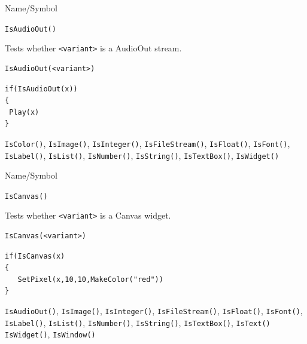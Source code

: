 \begin{desc}{Name/Symbol}
\item[Name/Symbol]	\verb+IsAudioOut()+

\item[Description]	Tests whether \verb+<variant>+ is a AudioOut stream.

\item[Usage]
\begin{verbatim}
IsAudioOut(<variant>)
\end{verbatim}

\item[Example]
\begin{verbatim}
if(IsAudioOut(x))
{
 Play(x)
}
\end{verbatim}

\item[See Also] \verb+IsColor()+, \verb+IsImage()+,
  \verb+IsInteger()+, \verb+IsFileStream()+, \verb+IsFloat()+,
  \verb+IsFont()+, \verb+IsLabel()+, \verb+IsList()+,
  \verb+IsNumber()+, \verb+IsString()+, \verb+IsTextBox()+,
  \verb+IsWidget()+
\end{desc}


\begin{desc}{Name/Symbol}
\item[Name/Symbol]	\verb+IsCanvas()+

\item[Description]	Tests whether \verb+<variant>+ is a Canvas widget.

\item[Usage]
\begin{verbatim}
IsCanvas(<variant>)
\end{verbatim}

\item[Example]
\begin{verbatim}
if(IsCanvas(x)
{
   SetPixel(x,10,10,MakeColor("red"))
}
\end{verbatim}

\item[See Also] \verb+IsAudioOut()+, \verb+IsImage()+,
  \verb+IsInteger()+, \verb+IsFileStream()+, \verb+IsFloat()+,
  \verb+IsFont()+, \verb+IsLabel()+, \verb+IsList()+,
  \verb+IsNumber()+, \verb+IsString()+, \verb+IsTextBox()+, \verb+IsText()+
  \verb+IsWidget()+, \verb+IsWindow()+
\end{desc}



